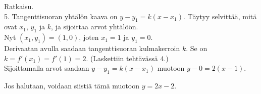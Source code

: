 \documentclass[10pt]{article}
\begin{document}
{\color{green!50!black}Ratkaisu.\\[2mm]

5. Tangenttisuoran yhtälön kaava on $y-y_1=k(x-x_1)$. Täytyy selvittää, mitä ovat $x_1$, $y_1$ ja $k$, ja sijoittaa arvot yhtälöön.\\

Nyt $(x_1,y_1)=(1,0)$, joten $x_1=1$ ja $y_1=0$.\\

Derivaatan avulla saadaan tangenttisuoran kulmakerroin $k$. Se on $k=f'(x_1)=f'(1)=2$. (Laskettiin tehtävässä 4.)\\

Sijoittamalla arvot saadaan $y-y_1=k(x-x_1)$ muotoon $y-0=2(x-1)$.

Jos halutaan, voidaan siistiä tämä muotoon $y=2x-2$.
}

\newpage
\end{document}
